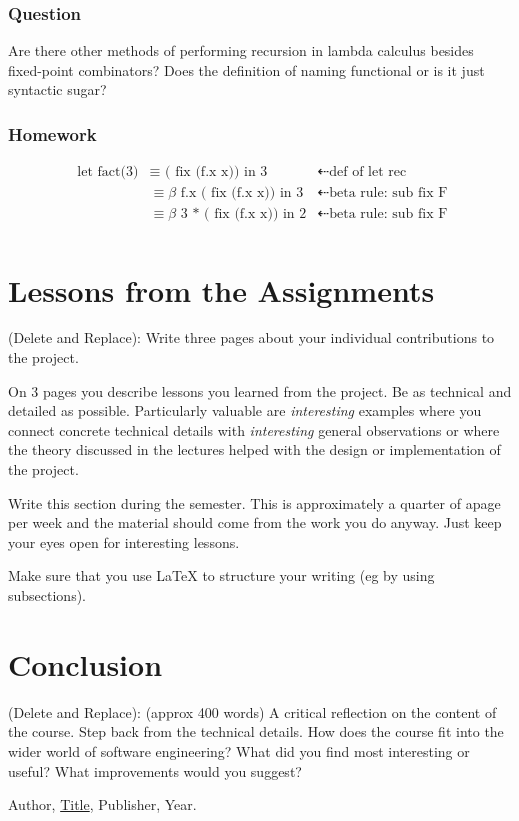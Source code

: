 \documentclass{article}
\theoremstyle{theorem}
\theoremstyle{definition}
\theoremstyle{remark}
\begin{document}
\subsubsection*{Question} Are there other methods of performing recursion in lambda calculus besides fixed-point combinators? Does the definition of naming functional or is it just syntactic sugar?

\subsubsection*{Homework}

\[
\begin{aligned}
  \text{ let fact(3)} &\equiv  \text{ ( fix (f.x x)) in 3} &\dashleftarrow\text{def of let rec}\\
  &\equiv\beta\text{ f.x ( fix (f.x x)) in 3} &\dashleftarrow\text{beta rule: sub fix F}\\
  &\equiv\beta\text{ 3 * ( fix (f.x x)) in 2} &\dashleftarrow\text{beta rule: sub fix F}\\
\end{aligned}
\]

\section{Lessons from the Assignments}

(Delete and Replace): Write three pages about your individual contributions to the project.

On 3 pages you describe lessons you learned from the project. Be as technical and detailed as possible. Particularly valuable are \emph{interesting} examples where you connect concrete technical details with \emph{interesting} general observations or where the theory discussed in the lectures helped with the design or implementation of the project.

Write this section during the semester. This is approximately a quarter of apage per week and the material should come from the work you do anyway. Just keep your eyes open for interesting lessons.

Make sure that you use \LaTeX{} to structure your writing (eg by using subsections).

\section{Conclusion}\label{conclusion}

(Delete and Replace): (approx 400 words) A critical reflection on the content of the course. Step back from the technical details. How does the course fit into the wider world of software engineering? What did you find most interesting or useful? What improvements would you suggest?

\begin{thebibliography}{99}
 Author, \href{https://en.wikipedia.org/wiki/LaTeX}{Title}, Publisher, Year.
\end{thebibliography}
\end{document}
